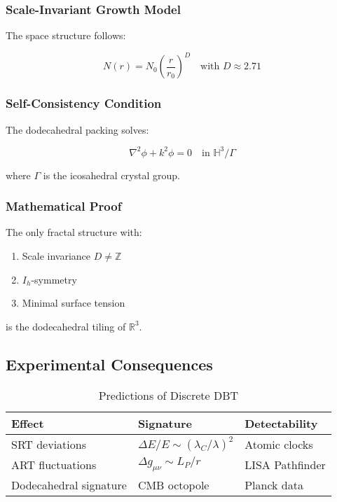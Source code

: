 \subsubsection{Scale-Invariant Growth Model}  
The space structure follows:  

\begin{equation}  
N(r) = N_0\left(\frac{r}{r_0}\right)^D \quad \text{with } D \approx 2.71  
\end{equation}  

\subsubsection{Self-Consistency Condition}  
The dodecahedral packing solves:  

\begin{equation}  
\nabla^2\phi + k^2\phi = 0 \quad \text{in } \mathbb{H}^3/\Gamma  
\end{equation}  

where $\Gamma$ is the icosahedral crystal group.  

\subsubsection{Mathematical Proof}  
\begin{theorem}  
The only fractal structure with:  
\begin{enumerate}  
\item Scale invariance $D \neq \mathbb{Z}$  
\item $I_h$-symmetry  
\item Minimal surface tension  
\end{enumerate}  
is the dodecahedral tiling of $\mathbb{R}^3$.  
\end{theorem}  

\subsection{Experimental Consequences}  
\label{subsec:experiments}  

\begin{table}[ht]
\centering  
\caption{Predictions of Discrete DBT}  
\begin{tabular}{lll}  
\hline  
Effect & Signature & Detectability \\  
\hline  
SRT deviations & $\Delta E/E \sim (\lambda_C/\lambda)^2$ & Atomic clocks \\  
ART fluctuations & $\Delta g_{\mu\nu} \sim L_P/r$ & LISA Pathfinder \\  
Dodecahedral signature & CMB octopole & Planck data \\  
\hline
\end{tabular}  
\end{table}  

